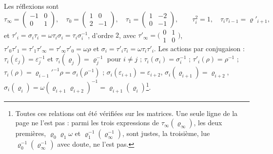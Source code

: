 \documentclass[11pt,a4paper]{article}
\begin{document}
Les réflexions sont
\[
\tau_\infty = \begin{pmatrix} -1 & 0 \\ 0 & 1 \end{pmatrix}, \quad
\tau_0 = \begin{pmatrix} 1 & 0 \\ 2 & -1 \end{pmatrix}, \quad
\tau_1 = \begin{pmatrix} 1 & -2 \\ 0 & -1 \end{pmatrix}, \qquad
\tau_i^2 = 1, \quad \tau_i\tau_{i-1} = \varrho'_{i+1},
\]
et $\tau'_i = \sigma_i\tau_i = \omega\tau_i\sigma_i = \tau_i\sigma_i^{-1}$,
d'ordre $2$, avec $\tau'_\infty = \bigl(\begin{smallmatrix} 0 & 1 \\ 1 & 0 \end{smallmatrix}\bigr)$,
$\tau'_0\tau'_1 = \tau'_1\tau'_\infty = \tau'_\infty\tau'_0 = \omega\rho$ et
$\sigma_i = \tau'_i\tau_i = \omega\tau_i\tau'_i$. Les actions par conjugaison :
$\tau_i(\varepsilon_j) = \varepsilon_j^{-1}$ et
$\tau_i(\varrho_j) = \varrho_j^{-1}$ pour $i \neq j$ ; $\tau_i(\sigma_i) = \sigma_i^{-1}$ ;
$\tau'_i(\rho) = \rho^{-1}$ ; $\tau_i(\rho) = \varrho_{i-1}'^{-1}\rho = \sigma_i(\rho^{-1})$ ;
$\sigma_i(\varepsilon_{i+1}) = \varepsilon_{i+2}$, $\sigma_i(\varrho_{i+1}) = \varrho_{i+2}$,
$\sigma_i(\varrho_i) = \omega(\varrho_{i+1}\varrho_{i+2})^{-1} = \varrho_{i+1}(\varrho_i)$\footnote{Toutes
ces relations ont été vérifiées sur les matrices. Une seule ligne de la page ne
l'est pas : parmi les trois expressions de $\tau_\infty(\varrho_\infty)$, les
deux premières, $\varrho_0\varrho_1\omega$ et $\varrho_1^{-1}(\varrho_\infty^{-1})$,
sont justes, la troisième, lue $\varrho_0^{-1}(\varrho_\infty^{-1})$ avec doute,
ne l'est pas.}.
\end{document}
